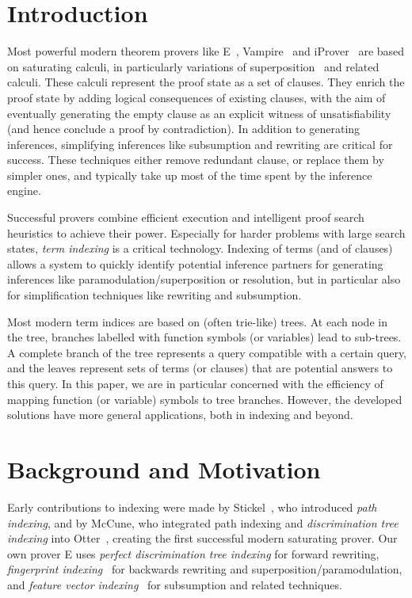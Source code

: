 \documentclass[]{ceurart}
\begin{document}
\section{Introduction}

Most powerful modern theorem provers like E~\cite{SCV:CADE-2019},
Vampire~\cite{BBCHHHKRRRSSV:CAV-2025} and iProver~\cite{DK:IJCAR-2020}
are based on saturating calculi, in particularly variations of
superposition~\cite{BG94} and related calculi. These calculi represent
the proof state as a set of clauses. They enrich the proof state by
adding logical consequences of existing clauses, with the aim of
eventually generating the empty clause as an explicit witness of
unsatisfiability (and hence conclude a proof by contradiction). In
addition to generating inferences, simplifying inferences like
subsumption and rewriting are critical for success. These techniques
either remove redundant clause, or replace them by simpler ones, and
typically take up most of the time spent by the inference engine.

Successful provers combine efficient execution and intelligent proof
search heuristics to achieve their power. Especially for harder
problems with large search states, \emph{term indexing} is a critical
technology. Indexing of terms (and of clauses) allows a system to
quickly identify potential inference partners for generating
inferences like paramodulation/superposition or resolution, but in
particular also for simplification techniques like rewriting and
subsumption.

Most modern term indices are based on (often trie-like) trees. At each
node in the tree, branches labelled with function symbols (or
variables) lead to sub-trees. A complete branch of the tree represents
a query compatible with a certain query, and the leaves represent sets
of terms (or clauses) that are potential answers to this query. In 
this paper, we are in particular concerned with the efficiency of
mapping function (or variable) symbols to tree branches. However, the
developed solutions have more general applications, both in indexing
and beyond.

\section{Background and Motivation}

Early contributions to indexing were made by
Stickel~\cite{Stickel:TRIndexing-89}, who introduced \emph{path
  indexing}, and by McCune, who integrated path indexing and
\emph{discrimination tree indexing} into Otter~\cite{Mc92}, creating
the first successful modern saturating prover. Our own prover E uses
\emph{perfect discrimination tree indexing} for forward rewriting,
\emph{fingerprint indexing}~\cite{Schulz:IJCAR-2012} for backwards
rewriting and superposition/paramodulation, and \emph{feature vector
  indexing}~\cite{Schulz:FVI-2013} for subsumption and related
techniques.
\end{document}
